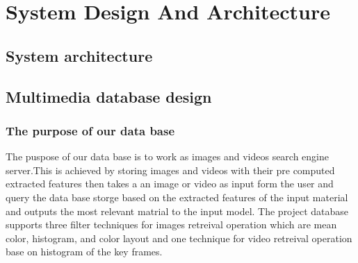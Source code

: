 \chapter{System Design And Architecture}
\section{System architecture}





\section{Multimedia database design}
\subsection{The purpose of our data base}
The puspose of our data base is to work as images and videos search engine server.This is achieved by storing images and videos with 
their pre computed extracted features then takes a an image or video as input form the user and query the data base storge based on 
the extracted features of the input material and outputs the most relevant matrial to the input model.
\vskip 0.2in
The project database supports three filter techniques for images retreival operation which are mean color, histogram, and color layout and 
one technique for video retreival operation base on histogram of the key frames.
